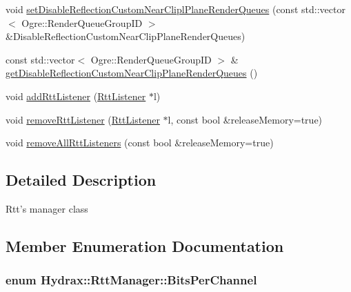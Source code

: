 \begin{CompactItemize}
\begin{CompactItemize}
void \hyperlink{class_hydrax_1_1_rtt_manager_46f7b77221e50359657a4ac2f3a2365c}{setDisableReflectionCustomNearCliplPlaneRenderQueues} (const std::vector$<$ Ogre::RenderQueueGroupID $>$ \&DisableReflectionCustomNearClipPlaneRenderQueues)
\item 
const std::vector$<$ Ogre::RenderQueueGroupID $>$ \& \hyperlink{class_hydrax_1_1_rtt_manager_8f851b42bccd3653458dad169b6fcff9}{getDisableReflectionCustomNearClipPlaneRenderQueues} ()
\item 
void \hyperlink{class_hydrax_1_1_rtt_manager_cd9d1c09314e9ada6f8f646b0b97dc48}{addRttListener} (\hyperlink{class_hydrax_1_1_rtt_manager_1_1_rtt_listener}{RttListener} $\ast$l)
\item 
void \hyperlink{class_hydrax_1_1_rtt_manager_9de0d5171c46f27d34493f85e6a4f8c3}{removeRttListener} (\hyperlink{class_hydrax_1_1_rtt_manager_1_1_rtt_listener}{RttListener} $\ast$l, const bool \&releaseMemory=true)
\item 
void \hyperlink{class_hydrax_1_1_rtt_manager_4aee49693758d34cdd0b613f251e09cc}{removeAllRttListeners} (const bool \&releaseMemory=true)
\end{CompactItemize}


\subsection{Detailed Description}
Rtt's manager class 

\subsection{Member Enumeration Documentation}
\hypertarget{class_hydrax_1_1_rtt_manager_ab09efbd8ec25f88656a27d6a4f0446e}{
\subsubsection[{BitsPerChannel}]{\setlength{\rightskip}{0pt plus 5cm}enum {\bf Hydrax::RttManager::BitsPerChannel}}}
\label{class_hydrax_1_1_rtt_manager_ab09efbd8ec25f88656a27d6a4f0446e}



\end{CompactItemize}
